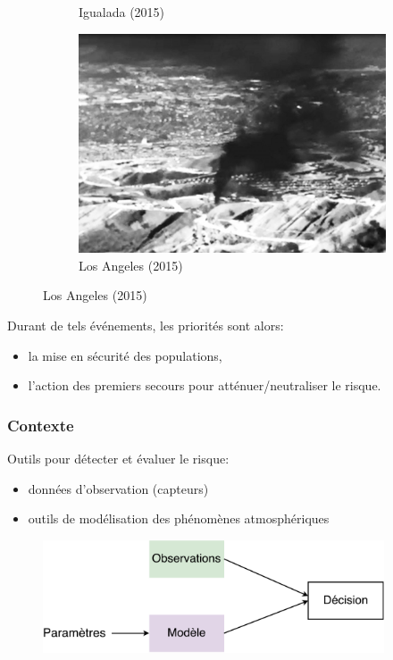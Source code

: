 \documentclass{beamer}
\begin{document}
\begin{frame}
\begin{figure}
\begin{subfigure}[b]{0.3\textwidth}
			\caption*{Igualada (2015)}
		\end{subfigure}
		\hfill
		\begin{subfigure}[b]{0.3\textwidth}
			\centering
			\includegraphics[width=\textwidth]{los_angeles}
			\caption*{Los Angeles (2015)}
		\end{subfigure}
	\end{figure}
	
	Durant de tels événements, les priorités sont alors:
	\begin{itemize}
		\item la mise en sécurité des populations,
		\item l'action des premiers secours pour atténuer/neutraliser le risque.
	\end{itemize}
\end{frame}


\begin{frame}
	\frametitle{Contexte}
	Outils pour détecter et évaluer le risque:
	\begin{itemize}
		\item données d'observation (capteurs)
		\item outils de modélisation des phénomènes atmosphériques
	\end{itemize}
	\begin{figure}
		\centering
		\includegraphics[width=0.9\textwidth]{diagram_context_2.pdf}
	\end{figure}
\end{frame}
\end{document}
